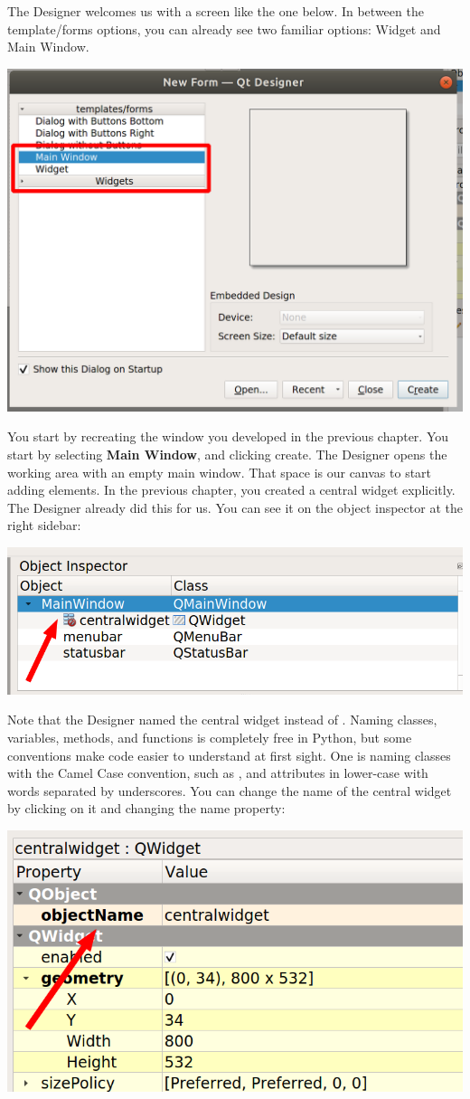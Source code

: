 The Designer welcomes us with a screen like the one below. In between the template/forms options, you can already see two familiar options: Widget and Main Window.

\begin{center}
    \includegraphics[width=.5\textwidth]{images/Chapter_09/01_Designer_Welcome.png}
\end{center}

You start by recreating the window you developed in the previous chapter. You start by selecting \textbf{Main Window}, and clicking create. The Designer opens the working area with an empty main window. That space is our canvas to start adding elements. In the previous chapter, you created a central widget explicitly. The Designer already did this for us. You can see it on the object inspector at the right sidebar:

\begin{center}
    \includegraphics[width=.5\textwidth]{images/Chapter_09/02_central_widget.png}
\end{center}

Note that the Designer named the central widget  instead of . Naming classes, variables, methods, and functions is completely free in Python, but some conventions make code easier to understand at first sight. One is naming classes with the Camel Case convention, such as , and attributes in lower-case with words separated by underscores. You can change the name of the central widget by clicking on it and changing the  name property:

\begin{center}
    \includegraphics[width=.5\textwidth]{images/Chapter_09/03_central_widget_name.png}
\end{center}

